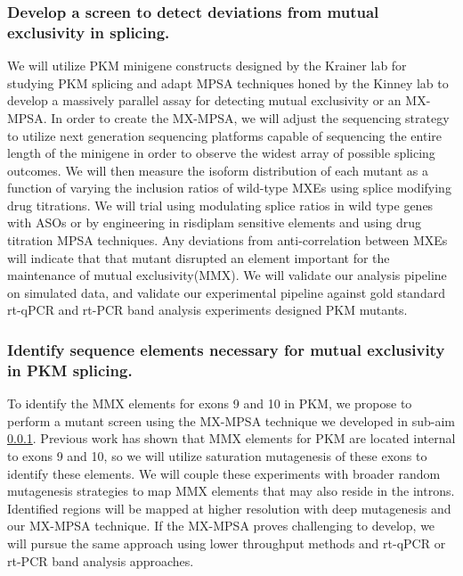 \documentclass{article}
\begin{document}
\subsubsection{Develop a screen to detect deviations from mutual exclusivity in splicing.} \label{aim:screen_dev}
We will utilize PKM minigene constructs designed by the Krainer lab for studying PKM splicing \cite{Wang2012-dr} and adapt MPSA techniques honed by the Kinney lab \cite{Wong2018-vq,Ishigami2022-bf} to develop a massively parallel assay for detecting mutual exclusivity or an MX-MPSA.
In order to create the MX-MPSA, we will adjust the sequencing strategy to utilize next generation sequencing platforms capable of sequencing the entire length of the minigene in order to observe the widest array of possible splicing outcomes.
We will then measure the isoform distribution of each mutant as a function of varying the inclusion ratios of wild-type MXEs using splice modifying drug titrations.
We will trial using modulating splice ratios in wild type genes with ASOs\cite{Wang2012-ea,Ma2022-dt} or by engineering in risdiplam sensitive elements and using drug titration MPSA techniques\cite{Ishigami2022-bf}. 
Any deviations from anti-correlation between MXEs will indicate that that mutant disrupted an element important for the maintenance of mutual exclusivity(MMX). We will validate our analysis pipeline on simulated data, and validate our experimental pipeline against gold standard rt-qPCR and rt-PCR band analysis experiments designed PKM mutants.
% 
\subsubsection{Identify sequence elements necessary for mutual exclusivity in PKM splicing.} \label{aim:PKM_motif_finding}
To identify the MMX elements for exons 9 and 10 in PKM, we propose to perform a mutant screen using the MX-MPSA technique we developed in sub-aim \ref{aim:screen_dev}. 
Previous work has shown that MMX elements for PKM are located internal to exons 9 and 10,\cite{Wang2012-dr} so we will utilize saturation mutagenesis of these exons to identify these elements.
We will couple these experiments with broader random mutagenesis strategies to map MMX elements that may also reside in the introns. 
Identified regions will be mapped at higher resolution with deep mutagenesis and our MX-MPSA technique. If the MX-MPSA proves challenging to develop, we will pursue the same approach using lower throughput methods and rt-qPCR or rt-PCR band analysis approaches.
%
\end{document}

